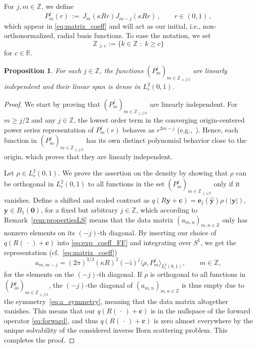 \documentclass[11pt,a4paper]{article}
\newtheorem{proposition}[theorem]{Proposition}
\theoremstyle{definition}
\theoremstyle{remark} \newtheorem{remark}[theorem]{Remark}
\numberwithin{equation}{section}
\numberwithin{figure}{section}
\numberwithin{algorithm}{section}
\numberwithin{table}{section}
\newcommand{\field}[1]{{\mathbb{#1}}}
\newcommand{\R}{\field{R}}
\newcommand{\Z}{\field{Z}}
\newcommand{\bs}{\boldsymbol}
\newcommand{\bfc}{{\bs c}}
\newcommand{\bfe}{{\bs e}}
\newcommand{\bfy}{{\bs y}}
\newcommand{\bfzero}{{\bs 0}}
\newcommand{\yhat}{\widehat{\bfy}}
\newcommand{\rmi}{\mathrm{i}}
\newcommand{\ph}{\,\cdot\,}
\newcommand{\Sone}{{S^1}}
\begin{document}
For $j,m\in\Z$, we define 
\begin{equation}
\label{eq:def_Pjm}
    P_{m}^{j}(r) \,:=\, J_{m}(\kappa R r) J_{m-j}(\kappa R r)
    \,,\qquad r\in(0,1)\,,
\end{equation}
which appear in \eqref{eq:matrix_coeff} and will act as our initial, i.e., non-orthonormalized, radial basis functions. To ease the notation, we set
\begin{equation*}
    \Z_{\geq c} := \{ k \in \Z \; : \;  k \geq c \}
\end{equation*}
for $c \in \R$.


\begin{proposition}
\label{prop:bases}
For each $j \in \Z$, the functions $(P_{m}^{j})_{m \in \Z_{\geq j/2}}$ are linearly independent and their linear span is dense in $L^2_r(0,1)$. 
\end{proposition}

\begin{proof}
    We start by proving that $(P_{m}^{j})_{m \in \Z_{\geq j/2}}$ are linearly independent. For $m \geq j/2$ and any $j \in \Z$, the lowest order  term in the converging origin-centered power series representation of $P_{m}^{j}(r)$ behaves as $r^{2m-j}$ (e.g.,~\cite[Sec.~5.41, Eq.~(1)]{Watson44}). Hence, each function in $(P_{m}^{j})_{m \in \Z_{\geq j/2}}$ has its own distinct polynomial behavior close to the origin, which proves that they are linearly independent. 

    Let $\rho \in L^2_r(0,1)$. We prove the assertion on the density by showing that $\rho$ can be orthogonal in $L^2_r(0,1)$ to all functions in the set $(P_{m}^{j})_{m \in \Z_{\geq j/2}}$ only if it vanishes. Define a shifted and scaled contrast as $q(R \bfy + \bfc) = \bfe_j(\yhat) \rho(|\bfy|)$, $\bfy \in B_1(\bfzero)$, for a fixed but arbitrary $j \in \Z$, which according to Remark~\ref{rem:propertiesLS} means that the data matrix $(a_{m,n})_{m,n\in\Z}$ only has nonzero elements on its $(-j)$-th diagonal. By inserting our choice of $q(R (\ph) + \bfc)$ into \eqref{eq:exp_coeff_FF} and integrating over $\Sone$, we get the representation (cf.~\eqref{eq:matrix_coeff})
    \begin{equation*}
        a_{m,m-j} =  (2\pi)^{3/2}(\kappa R)^2(-\rmi)^{j} \langle \rho,  P_{m}^{j} \rangle_{L^2_r(0,1)}, \qquad m \in \Z,
    \end{equation*}
    for the elements on the $(-j)$-th diagonal. If $\rho$ is orthogonal to all functions in $(P_{m}^{j})_{m \in \Z_{\geq j/2}}$, the $(-j)$-the diagonal of $(a_{m,n})_{m,n\in\Z}$ is thus empty due to the symmetry~\eqref{eq:a_symmetry}, meaning that the data matrix altogether vanishes. This means that our $q(R (\ph) + \bfc)$ is in the nullspace of the forward operator \eqref{eq:forward}, and thus $q(R (\ph) + \bfc)$ is zero almost everywhere by the unique solvability of the considered inverse Born scattering problem. This completes the proof.
\end{proof}
\end{document}
